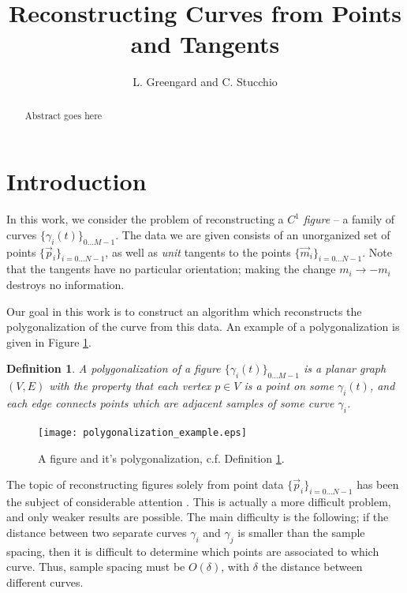 \documentclass{article}
\newtheorem{definition}[cntr]{Definition}
\numberwithin{cntr}{section}
\numberwithin{equation}{section}
\newcommand{\vp}[0]{{\vec{p}}}
\newcommand{\vm}[0]{{\vec{m}}}
\newcommand{\Oto}[1]{{0 \ldots #1-1}}
\newcommand{\OtoN}{{0 \ldots N-1}}
\newcommand{\pointData}{{ \{ \vp_{i} \}_{i=\OtoN} }}
\newcommand{\tanData}{{ \{ \vm_{i} \}_{i=\OtoN} }}
\newcommand{\curveSet}{{ \{ \gamma_i(t) \}_{\Oto{M}}}}
\newcommand{\curvesep}{{\delta}}
\begin{document}
\title{Reconstructing Curves from Points and Tangents}

\author{L. Greengard and C. Stucchio}

\maketitle

\begin{abstract}
  Abstract goes here
\end{abstract}

\section{Introduction}

In this work, we consider the problem of reconstructing a $C^{1}$ \emph{figure} -- a family of curves $\curveSet$. The data we are given consists of an unorganized set of points $\pointData$, as well as \emph{unit} tangents to the points $\tanData$. Note that the tangents have no particular orientation; making the change $m_{i} \rightarrow -m_{i}$ destroys no information.

Our goal in this work is to construct an algorithm which reconstructs the polygonalization of the curve from this data. An example of a polygonalization is given in Figure \ref{fig:polygonalization}.

\begin{definition}
  \label{def:polygonalization}
  A polygonalization of a figure $\curveSet$ is a planar graph $(V,E)$ with the property that each vertex $p \in V$ is a point on some $\gamma_{i}(t)$, and each edge connects points which are adjacent samples of some curve $\gamma_{i}$.
\end{definition}

\begin{figure}
\setlength{\unitlength}{0.240900pt}
\ifx\plotpoint\undefined\newsavebox{\plotpoint}\fi
\sbox{\plotpoint}{\rule[-0.200pt]{0.400pt}{0.400pt}}%
\texttt{[image: polygonalization\_example.eps]}

\caption{A figure and it's polygonalization, c.f. Definition \ref{def:polygonalization}. }
\label{fig:polygonalization}
\end{figure}

The topic of reconstructing figures solely from point data $\pointData$ has been the subject of considerable attention \cite{amenta98crust,amenta98new,dey99curve,hoppe92surface,amenta02simple, dey01reconstructing}. This is actually a more difficult problem, and only weaker results are possible. The main difficulty is the following; if the distance between two separate curves $\gamma_{i}$ and $\gamma_{j}$ is smaller than the sample spacing, then it is difficult to determine which points are associated to which curve. Thus, sample spacing must be $O(\curvesep)$, with $\curvesep$ the distance between different curves.
\end{document}
